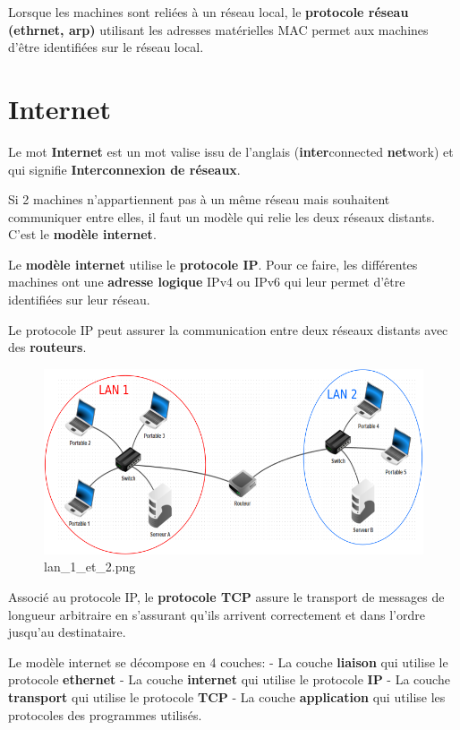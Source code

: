 \documentclass[11pt]{article}
\begin{document}
Lorsque les machines sont reliées à un réseau local, le
\textbf{protocole réseau (ethrnet, arp)} utilisant les adresses
matérielles MAC permet aux machines d'être identifiées sur le réseau
local.

    \hypertarget{internet}{%
\section{Internet}\label{internet}}

Le mot \textbf{Internet} est un mot valise issu de l'anglais
(\textbf{inter}connected \textbf{net}work) et qui signifie
\textbf{Interconnexion de réseaux}.

Si 2 machines n'appartiennent pas à un même réseau mais souhaitent
communiquer entre elles, il faut un modèle qui relie les deux réseaux
distants. C'est le \textbf{modèle internet}.

Le \textbf{modèle internet} utilise le \textbf{protocole IP}. Pour ce
faire, les différentes machines ont une \textbf{adresse logique} IPv4 ou
IPv6 qui leur permet d'être identifiées sur leur réseau.

Le protocole IP peut assurer la communication entre deux réseaux
distants avec des \textbf{routeurs}.

    \begin{figure}
\centering
\includegraphics{img/lan_1_et_2.png}
\caption{lan\_1\_et\_2.png}
\end{figure}

    Associé au protocole IP, le \textbf{protocole TCP} assure le transport
de messages de longueur arbitraire en s'assurant qu'ils arrivent
correctement et dans l'ordre jusqu'au destinataire.

Le modèle internet se décompose en 4 couches: - La couche
\textbf{liaison} qui utilise le protocole \textbf{ethernet} - La couche
\textbf{internet} qui utilise le protocole \textbf{IP} - La couche
\textbf{transport} qui utilise le protocole \textbf{TCP} - La couche
\textbf{application} qui utilise les protocoles des programmes utilisés.
\end{document}
